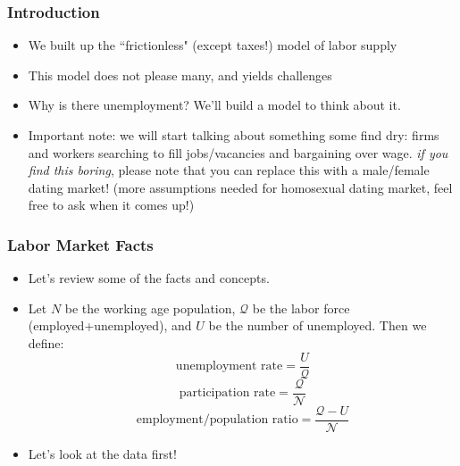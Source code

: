\documentclass{beamer}
\author{Trevor S. Gallen}
\date{}
\begin{document}
\renewcommand*{\inserttotalframenumber}{\pageref{lastframe}}



\begin{frame}
\titlepage
\end{frame}

\begin{frame}
\frametitle[alignment=center]{Introduction}
\begin{itemize}
\item We built up the ``frictionless" (except taxes!) model of labor supply
\bigskip
\item This model does not please many, and yields challenges  
\bigskip
\item Why is there unemployment?  We'll build a model to think about it.
\bigskip
\item Important note: we will start talking about something some find dry:  firms and workers searching to fill jobs/vacancies and bargaining over wage.  \emph{if you find this boring}, please note that you can replace this with a male/female dating market! (more assumptions needed for homosexual dating market, feel free to ask when it comes up!)
\end{itemize}
\end{frame}

\begin{frame}
\frametitle[alignment=center]{Labor Market Facts}
\begin{itemize}
\item Let's review some of the facts and concepts.
\bigskip
\item Let $N$ be the working age population, $\mathcal{Q}$ be the labor force (employed+unemployed), and $U$ be the number of unemployed.  Then we define:
$$\text{unemployment rate}=\frac{U}{\mathcal{Q}}$$
$$\text{participation rate}=\frac{\mathcal{Q}}{\mathcal{N}}$$
$$\text{employment/population ratio}=\frac{\mathcal{Q}-U}{\mathcal{N}}$$
\bigskip
\item Let's look at the data first!
\end{itemize}
\end{frame}
\end{document}
